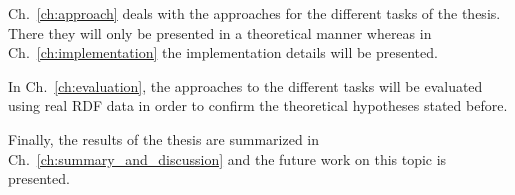 Ch.~\ref{ch:approach} deals with the approaches for the different tasks of the thesis. There they will only be presented in a theoretical manner whereas in Ch.~\ref{ch:implementation} the implementation details will be presented.

In Ch.~\ref{ch:evaluation}, the approaches to the different tasks will be evaluated using real RDF data in order to confirm the theoretical hypotheses stated before.

Finally, the results of the thesis are summarized in Ch.~\ref{ch:summary_and_discussion} and the future work on this topic is presented.








